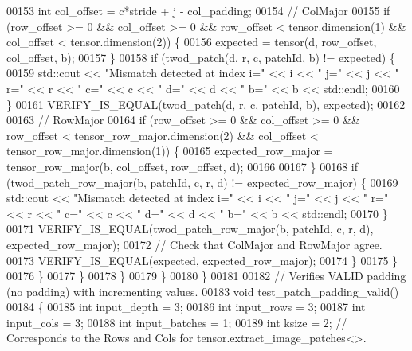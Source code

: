 \begin{DoxyCode}
00153               \textcolor{keywordtype}{int} col\_offset = c*stride + j - col\_padding;
00154               \textcolor{comment}{// ColMajor}
00155               \textcolor{keywordflow}{if} (row\_offset >= 0 && col\_offset >= 0 && row\_offset < tensor.dimension(1) && col\_offset < 
      tensor.dimension(2)) \{
00156                 expected = tensor(d, row\_offset, col\_offset, b);
00157               \}
00158               \textcolor{keywordflow}{if} (twod\_patch(d, r, c, patchId, b) != expected) \{
00159                 std::cout << \textcolor{stringliteral}{"Mismatch detected at index i="} << i << \textcolor{stringliteral}{" j="} << j << \textcolor{stringliteral}{" r="} << r << \textcolor{stringliteral}{" c="} << c
       << \textcolor{stringliteral}{" d="} << d << \textcolor{stringliteral}{" b="} << b << std::endl;
00160               \}
00161               VERIFY\_IS\_EQUAL(twod\_patch(d, r, c, patchId, b), expected);
00162 
00163               \textcolor{comment}{// RowMajor}
00164               \textcolor{keywordflow}{if} (row\_offset >= 0 && col\_offset >= 0 && row\_offset < tensor\_row\_major.dimension(2) && 
      col\_offset < tensor\_row\_major.dimension(1)) \{
00165                 expected\_row\_major = tensor\_row\_major(b, col\_offset, row\_offset, d);
00166 
00167               \}
00168               \textcolor{keywordflow}{if} (twod\_patch\_row\_major(b, patchId, c, r, d) != expected\_row\_major) \{
00169                 std::cout << \textcolor{stringliteral}{"Mismatch detected at index i="} << i << \textcolor{stringliteral}{" j="} << j << \textcolor{stringliteral}{" r="} << r << \textcolor{stringliteral}{" c="} << c
       << \textcolor{stringliteral}{" d="} << d << \textcolor{stringliteral}{" b="} << b << std::endl;
00170               \}
00171               VERIFY\_IS\_EQUAL(twod\_patch\_row\_major(b, patchId, c, r, d), expected\_row\_major);
00172               \textcolor{comment}{// Check that ColMajor and RowMajor agree.}
00173               VERIFY\_IS\_EQUAL(expected, expected\_row\_major);
00174             \}
00175           \}
00176         \}
00177       \}
00178     \}
00179   \}
00180 \}
00181 
00182 \textcolor{comment}{// Verifies VALID padding (no padding) with incrementing values.}
00183 \textcolor{keywordtype}{void} test\_patch\_padding\_valid()
00184 \{
00185   \textcolor{keywordtype}{int} input\_depth = 3;
00186   \textcolor{keywordtype}{int} input\_rows = 3;
00187   \textcolor{keywordtype}{int} input\_cols = 3;
00188   \textcolor{keywordtype}{int} input\_batches = 1;
00189   \textcolor{keywordtype}{int} ksize = 2;  \textcolor{comment}{// Corresponds to the Rows and Cols for tensor.extract\_image\_patches<>.}

\end{DoxyCode}
